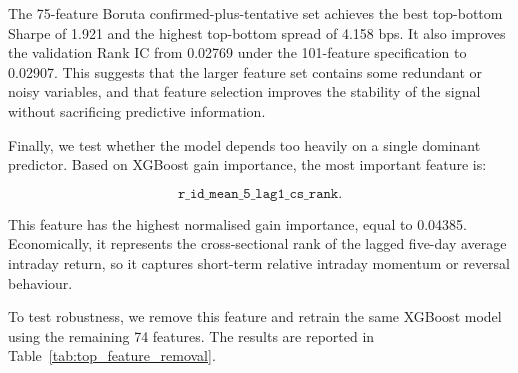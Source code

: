 \documentclass[12pt]{article}
\begin{document}
\begin{table}[htbp]
\centering
\caption{Feature selection robustness results}
\label{tab:feature_selection_robustness}
\end{table}

The 75-feature Boruta confirmed-plus-tentative set achieves the best top-bottom Sharpe of 1.921 and the highest top-bottom spread of 4.158 bps. It also improves the validation Rank IC from 0.02769 under the 101-feature specification to 0.02907. This suggests that the larger feature set contains some redundant or noisy variables, and that feature selection improves the stability of the signal without sacrificing predictive information.

Finally, we test whether the model depends too heavily on a single dominant predictor. Based on XGBoost gain importance, the most important feature is:

\[
\texttt{r\_id\_mean\_5\_lag1\_cs\_rank}.
\]

This feature has the highest normalised gain importance, equal to 0.04385. Economically, it represents the cross-sectional rank of the lagged five-day average intraday return, so it captures short-term relative intraday momentum or reversal behaviour.

To test robustness, we remove this feature and retrain the same XGBoost model using the remaining 74 features. The results are reported in Table~\ref{tab:top_feature_removal}.
\end{document}
